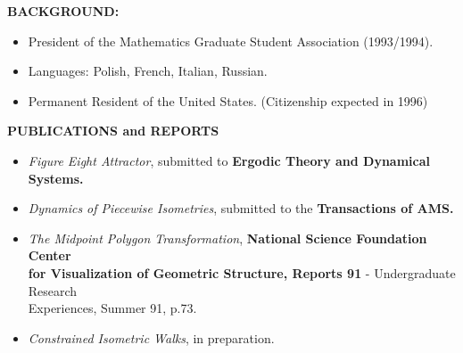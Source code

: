 \hspace{-.29in} {\bf BACKGROUND:}
\begin{itemize}
\vspace{-.06in}
\item  President of the Mathematics Graduate Student Association (1993/1994).  \vspace{-.06in}
\item   Languages:   Polish, French, Italian, Russian.  
\vspace{-.06in}
\item Permanent Resident of the  United States. (Citizenship expected in 1996)
\end{itemize}

\vspace{.12in}
 
  \hspace{-.29in} {\bf  PUBLICATIONS and REPORTS }
\begin{itemize}
\vspace{-.08in}

\item    {\em Figure Eight Attractor},  
submitted to {\bf Ergodic Theory and Dynamical Systems.}

  \vspace{-.08in}
\item  {\em Dynamics of Piecewise Isometries},    
submitted to the {\bf Transactions of AMS.}
\vspace{-.08in}
\item    {\em The  Midpoint   Polygon  Transformation},  
{\bf National Science Foundation Center\\ for Visualization of Geometric Structure, Reports  91} - 
        Undergraduate    Research\\
Experiences,  Summer 91,  p.73.
\vspace{-.08in}
\item  { \em Constrained Isometric Walks},  in preparation.


\end{itemize}










			





